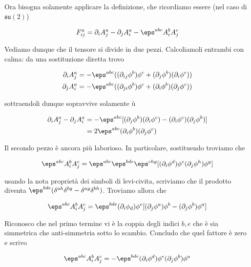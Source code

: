 \documentclass{report}
\begin{document}
Ora bisogna solamente applicare la definizione, che ricordiamo essere (nel caso di \(\mathfrak{su}(2)\))

\begin{align}
    F^a_{ij} = \partial_i A^a_j - \partial_j A^a_i - \eps^{abc} A^b_i A^c_j
\end{align}

Vediamo dunque che il tensore si divide in due pezzi. Calcoliamoli entrambi con calma: da una sostituzione diretta trovo


\begin{align}
    \partial_i A^a_j &= -\eps^{abc}((\partial_{ij}\phi^b)\phi^c + (\partial_j \phi^b)(\partial_i \phi^c)) \\
    \partial_j A^a_i &= -\eps^{abc}((\partial_{ji}\phi^b)\phi^c + (\partial_i \phi^b)(\partial_j \phi^c))
\end{align}

sottraendoli dunque sopravvive solamente ù

\begin{align}
    \partial_i A^a_j - \partial_j A^a_i &= -\eps^{abc} [(\partial_j \phi^b)(\partial_i \phi^c) - (\partial_i \phi^c)(\partial_j \phi^b)] \\
    &= 2\eps^{abc}(\partial_i \phi^b)(\partial_j \phi^c)
\end{align}


Il secondo pezzo è ancora più laborioso. In particolare, sostituendo troviamo che 

\begin{align}
    \eps^{abc}A^b_i A^c_j = \eps^{abc}\eps^{bde}\eps^{chg}[(\partial_i \phi^d)\phi^e (\partial_j \phi^h)\phi^g]
\end{align}

usando la nota proprietà dei simboli di levi-civita, scriviamo che il prodotto diventa \(\eps^{bde}(\delta^{ah}\delta^{bg} -\delta^{ag}\delta^{bh})\). Troviamo allora che 

\begin{align}
    \eps^{abc}A^b_i A^c_j = \eps^{bde}(\partial_i\phi_d)\phi^e [(\partial_j \phi^a)\phi^b - (\partial_j\phi^b)\phi^a]
\end{align}

Riconosco che nel primo termine vi è la coppia degli indici \(b, e\) che è sia simmetrica che anti-simmetria sotto lo scambio. Concludo che quel fattore è zero e scrivo 

\begin{align}
    \eps^{abc}A^b_i A^c_j = -\eps^{bde}(\partial_i \phi^d)\phi^e (\partial_j \phi^b)\phi^a
\end{align}
\end{document}
